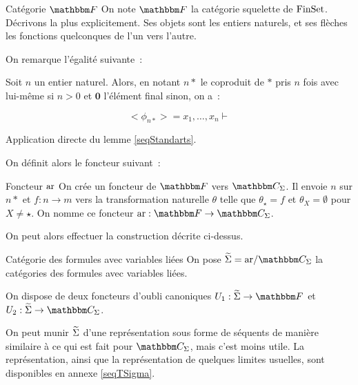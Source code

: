 \begin{defi}{Catégorie $\cf$}
    On note $\cf$ la catégorie squelette de $\text{FinSet}$. Décrivons la plus explicitement.
    Ses objets sont les entiers naturels, et ses flèches les fonctions quelconques
    de l'un vers l'autre.
\end{defi}

On remarque l'égalité suivante~:

\begin{lem}
    Soit $n$ un entier naturel. Alors, en notant $n\ast$ le coproduit de $\ast$ pris
    $n$ fois avec lui-même si $n>0$ et $\mathbf{0}$ l'élément final sinon, on
    a~:

    \[ <\phi_{n\ast}> = x_1,\dots, x_n\vdash \]
\end{lem}

\begin{pv}
    Application directe du lemme \ref{seqStandarts}.
\end{pv}

On définit alors le foncteur suivant~:

\begin{defi}{Foncteur $\text{ar}$}
    On crée un foncteur de $\cf$ vers $\C_\Sigma$. Il envoie $n$ sur $n\ast$ et
    $f : n\rightarrow m$ vers la transformation naturelle $\theta$ telle que
    $\theta_\star = f$ et $\theta_X = \emptyset$ pour $X\neq\star$. On nomme ce
    foncteur $\arf : \cf\rightarrow\C_\Sigma$.
\end{defi}

On peut alors effectuer la construction décrite ci-dessus.

\begin{defi}{Catégorie des formules avec variables liées}
    On pose $\tsigma = \arf/\C_\Sigma$ la catégories des formules avec variables
    liées.

    On dispose de deux foncteurs d'oubli canoniques $U_1 : \tsigma\rightarrow\cf$
    et $U_2 : \tsigma\rightarrow\C_\Sigma$.
\end{defi}

On peut munir $\widetilde{\Sigma}$ d'une représentation sous forme de séquents de manière
similaire à ce qui est fait pour $\C_\Sigma$, mais c'est moins utile. La représentation,
ainsi que la représentation de quelques limites usuelles, sont disponibles en
annexe \ref{seqTSigma}.

